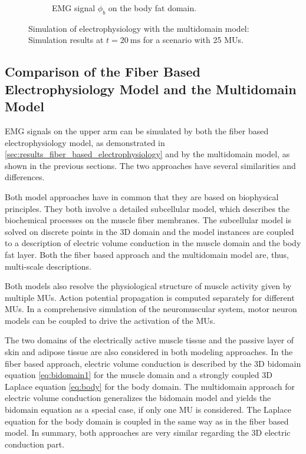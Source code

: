 \begin{figure}
\begin{subfigure}[t]{\textwidth}
    \caption{EMG signal $\phi_b$ on the body fat domain.}%
    \label{fig:multidomain_25mus2_body}%
  \end{subfigure}
  \caption{Simulation of electrophysiology with the multidomain model: Simulation results at $t=\SI{20}{\ms}$ for a scenario with 25 MUs.}%
  \label{fig:multidomain_25mus2}%
\end{figure}%


\subsection{Comparison of the Fiber Based Electrophysiology Model and the Multidomain Model}\label{sec:multidomain_differences}

EMG signals on the upper arm can be simulated by both the fiber based electrophysiology model, as demonstrated in \cref{sec:results_fiber_based_electrophysiology} and by the multidomain model, as shown in the previous sections. The two approaches have several similarities and differences.

Both model approaches have in common that they are based on biophysical principles. They both involve a detailed subcellular model, which describes the biochemical processes on the muscle fiber membranes. The subcellular model is solved on discrete points in the 3D domain and the model instances are coupled to a description of electric volume conduction in the muscle domain and the body fat layer.  Both the fiber based approach and the multidomain model are, thus, multi-scale descriptions. 

Both models also resolve the physiological structure of muscle activity given by multiple MUs. Action potential propagation is computed separately for different MUs. In a comprehensive simulation of the neuromuscular system, motor neuron models can be coupled to drive the activation of the MUs.

The two domains of the electrically active muscle tissue and the passive layer of skin and adipose tissue are also considered in both modeling approaches. In the fiber based approach, electric volume conduction is described by the 3D bidomain equation \cref{eq:bidomain1} for the muscle domain and a strongly coupled 3D Laplace equation \cref{eq:body} for the body domain.
The multidomain approach for electric volume conduction generalizes the bidomain model and yields the bidomain equation as a special case, if only one MU is considered. The Laplace equation for the body domain is coupled in the same way as in the fiber based model. In summary, both approaches are very similar regarding the 3D electric conduction part.

